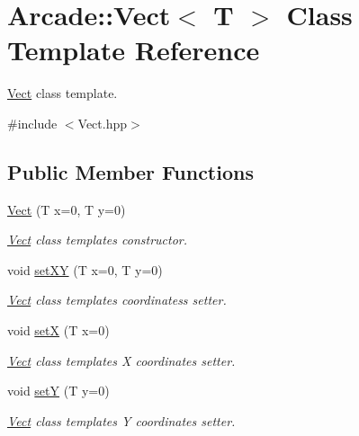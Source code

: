 \hypertarget{class_arcade_1_1_vect}{}\section{Arcade\+:\+:Vect$<$ T $>$ Class Template Reference}
\label{class_arcade_1_1_vect}


\hyperlink{class_arcade_1_1_vect}{Vect} class template.  




{\ttfamily \#include $<$Vect.\+hpp$>$}

\subsection*{Public Member Functions}
\begin{DoxyCompactItemize}
\item 
\hyperlink{class_arcade_1_1_vect_a9563cff4e95df68c9c39af00ba537d45}{Vect} (T x=0, T y=0)
\begin{DoxyCompactList}\small\item\em \hyperlink{class_arcade_1_1_vect}{Vect} class template\textquotesingle{}s constructor. \end{DoxyCompactList}\item 
void \hyperlink{class_arcade_1_1_vect_a08e707c4b986c33db4f1b1b749952bf3}{set\+XY} (T x=0, T y=0)
\begin{DoxyCompactList}\small\item\em \hyperlink{class_arcade_1_1_vect}{Vect} class template\textquotesingle{}s coordinates\textquotesingle{}s setter. \end{DoxyCompactList}\item 
void \hyperlink{class_arcade_1_1_vect_aa8eb2bf7c76a34771ebe1ee14b61028c}{setX} (T x=0)
\begin{DoxyCompactList}\small\item\em \hyperlink{class_arcade_1_1_vect}{Vect} class template\textquotesingle{}s X coordinate\textquotesingle{}s setter. \end{DoxyCompactList}\item 
void \hyperlink{class_arcade_1_1_vect_a4b4d15fd902f40d1e874471fb596612c}{setY} (T y=0)
\begin{DoxyCompactList}\small\item\em \hyperlink{class_arcade_1_1_vect}{Vect} class template\textquotesingle{}s Y coordinate\textquotesingle{}s setter. \end{DoxyCompactList}\item 

\end{DoxyCompactItemize}
